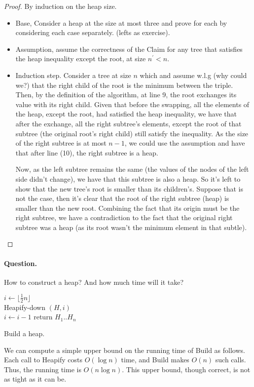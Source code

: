 \begin{proof}
  
By induction on the heap size.  
 
\begin{itemize} 
  \item Base, Consider a heap at the size at most three and prove for each by considering each case separately. (lefts as exercise).  
  \item Assumption, assume the correctness of the Claim for any tree that satisfies the heap inequality except the root, at size $n^{\prime} < n$. 
  \item Induction step. Consider a tree at size $n$ which and assume w.l.g (why could we?) that the right child of the root is the minimum between the triple. Then, by the definition of the algorithm, at line 9, the root exchanges its value with its right child. Given that before the swapping, all the elements of the heap, except the root, had satisfied the heap inequality, we have that after the exchange, all the right subtree's elements, except the root of that subtree (the original root's right child) still satisfy the inequality. As the size of the right subtree is at most $n-1$, we could use the assumption and have that after line (10), the right subtree is a heap.  

    Now, as the left subtree remains the same (the values of the nodes of the left side didn't change), we have that this subtree is also a heap. So it's left to show that the new tree's root is smaller than its children's. Suppose that is not the case, then it's clear that the root of the right subtree (heap) is smaller than the new root. Combining the fact that its origin must be the right subtree, we have a contradiction to the fact that the original right subtree was a heap (as its root wasn't the minimum element in that subtle).  
 
\end{itemize} 
 \end{proof}

\paragraph{Question.} How to construct a heap? And how much time will it take?   

\begin{algorithm}[H]
  $ i \leftarrow \lfloor \frac{1}{2}n  \rfloor $ \\
  { 
    Heapify-down $\left( H, i \right)$ \\ 
    $ i \leftarrow i - 1 $  
  }
return $H_{1} .. H_{n}$
\caption{ Build a heap. } 
\end{algorithm}
We can compute a simple upper bound on the running time of Build as follows. Each call to Heapify costs $O(\log n)$ time, and Build makes $O(n)$ such calls. Thus, the running time is $O(n \log n)$. This upper bound, though correct, is not as tight as it can be.

